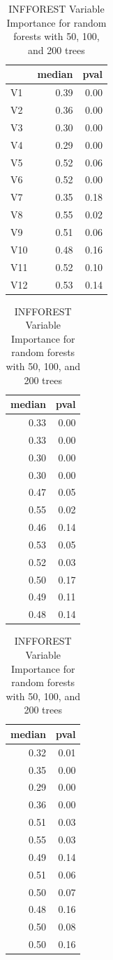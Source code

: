 \documentclass[12pt,twoside]{reedthesis}
\begin{document}
  \begin{table}
  \caption{\label{tab:unnamed-chunk-30}\label{tab:tabntree}INFFOREST Variable Importance for random forests with 50, 100, and 200 trees}
  
  \centering
  \begin{tabular}[t]{l|r|r}
  \hline
    & median & pval\\
  \hline
  V1 & 0.39 & 0.00\\
  \hline
  V2 & 0.36 & 0.00\\
  \hline
  V3 & 0.30 & 0.00\\
  \hline
  V4 & 0.29 & 0.00\\
  \hline
  V5 & 0.52 & 0.06\\
  \hline
  V6 & 0.52 & 0.00\\
  \hline
  V7 & 0.35 & 0.18\\
  \hline
  V8 & 0.55 & 0.02\\
  \hline
  V9 & 0.51 & 0.06\\
  \hline
  V10 & 0.48 & 0.16\\
  \hline
  V11 & 0.52 & 0.10\\
  \hline
  V12 & 0.53 & 0.14\\
  \hline
  \end{tabular}
  \centering
  \begin{tabular}[t]{r|r}
  \hline
  median & pval\\
  \hline
  0.33 & 0.00\\
  \hline
  0.33 & 0.00\\
  \hline
  0.30 & 0.00\\
  \hline
  0.30 & 0.00\\
  \hline
  0.47 & 0.05\\
  \hline
  0.55 & 0.02\\
  \hline
  0.46 & 0.14\\
  \hline
  0.53 & 0.05\\
  \hline
  0.52 & 0.03\\
  \hline
  0.50 & 0.17\\
  \hline
  0.49 & 0.11\\
  \hline
  0.48 & 0.14\\
  \hline
  \end{tabular}
  \centering
  \begin{tabular}[t]{r|r}
  \hline
  median & pval\\
  \hline
  0.32 & 0.01\\
  \hline
  0.35 & 0.00\\
  \hline
  0.29 & 0.00\\
  \hline
  0.36 & 0.00\\
  \hline
  0.51 & 0.03\\
  \hline
  0.55 & 0.03\\
  \hline
  0.49 & 0.14\\
  \hline
  0.51 & 0.06\\
  \hline
  0.50 & 0.07\\
  \hline
  0.48 & 0.16\\
  \hline
  0.50 & 0.08\\
  \hline
  0.50 & 0.16\\
  \hline
  \end{tabular}
  \end{table}
  
\end{document}

